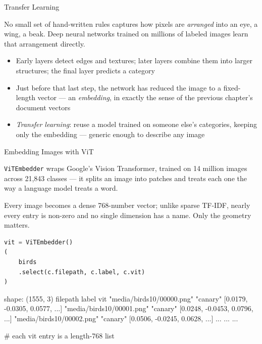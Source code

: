 \documentclass[8pt,aspectratio=169]{beamer}
\begin{document}
\begin{textframe}{Transfer Learning}

No small set of hand-written rules captures how pixels are \textit{arranged} into an eye, a wing, a beak. Deep neural networks trained on millions of labeled images learn that arrangement directly.

\begin{itemize}
\item Early layers detect edges and textures; later layers combine them into larger structures; the final layer predicts a category
\item Just before that last step, the network has reduced the image to a fixed-length vector --- an \textit{embedding}, in exactly the sense of the previous chapter's document vectors
\item \textit{Transfer learning}: reuse a model trained on someone else's categories, keeping only the embedding --- generic enough to describe any image
\end{itemize}

\end{textframe}

\begin{frame}[fragile]{Embedding Images with ViT}
\begin{splitcode}{%

\texttt{ViTEmbedder} wraps Google's Vision Transformer, trained on 14 million images across 21,843 classes --- it splits an image into patches and treats each one the way a language model treats a word.

Every image becomes a dense 768-number vector; unlike sparse TF-IDF, nearly every entry is non-zero and no single dimension has a name. Only the geometry matters.

}
\begin{lstlisting}[language=Python]
vit = ViTEmbedder()
(
    birds
    .select(c.filepath, c.label, c.vit)
)
\end{lstlisting}
\begin{codeoutput}
shape: (1555, 3)
filepath                   label     vit
"media/birds10/00000.png"  "canary"  [0.0179, -0.0305, 0.0577, ...]
"media/birds10/00001.png"  "canary"  [0.0248, -0.0453, 0.0796, ...]
"media/birds10/00002.png"  "canary"  [0.0506, -0.0245, 0.0628, ...]
...                        ...       ...

# each vit entry is a length-768 list
\end{codeoutput}
\end{splitcode}
\end{frame}
\end{document}
